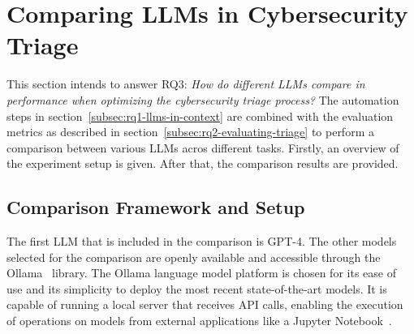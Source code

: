 \section{Comparing LLMs in Cybersecurity Triage}
\label{sec:rq3}

This section intends to answer RQ3:
\textit{How do different LLMs compare in performance when optimizing the cybersecurity triage process?}
The automation steps in section\ \ref{subsec:rq1-llms-in-context} are combined with the evaluation metrics as described
in section\ \ref{subsec:rq2-evaluating-triage} to perform a comparison between various LLMs acros different tasks.
Firstly, an overview of the experiment setup is given.
After that, the comparison results are provided.

\subsection{Comparison Framework and Setup}
\label{subsec:rq3-comparison-framework}

The first LLM that is included in the comparison is GPT-4.
The other models selected for the comparison are openly available and accessible through the
Ollama\ \citep{ollama} library.
The Ollama language model platform is chosen for its ease of use and its simplicity to deploy the most recent
state-of-the-art models.
It is capable of running a local server that receives API calls, enabling the execution of operations on models from
external applications like a Jupyter Notebook\ \citep{kluyver2016jupyter}.

